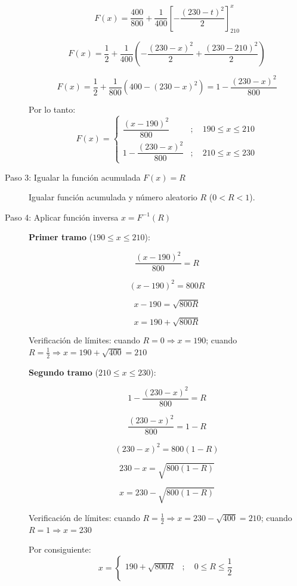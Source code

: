 \documentclass{article}
\begin{document}
\begin{description}
\[
F(x)
=
\frac{400}{800}
+
\frac{1}{400}\left[-\frac{(230-t)^2}{2}\right]_{210}^{x}
\]

\[
F(x)
=
\frac{1}{2}
+
\frac{1}{400}\left(-\frac{(230-x)^2}{2}+\frac{(230-210)^2}{2}\right)
\]
    
    \[
    F(x)
    =
    \frac{1}{2}
    +
    \frac{1}{800}\left(400-(230-x)^2\right)
    =
    1-\frac{(230-x)^2}{800}
    \]
    
    Por lo tanto:
    \[
    F(x)=
    \begin{cases}
    \dfrac{(x-190)^2}{800}
    & ; \quad 190 \le x \le 210
    \\[10pt]
    
    1-\dfrac{(230-x)^2}{800}
    & ; \quad 210 \le x \le 230
    \end{cases}
    \]
    
    \item[Paso 3: Igualar la función acumulada $F(x) = R$]
    
    Igualar función acumulada y número aleatorio $R$ ($0 < R < 1$).
    
    \item[Paso 4: Aplicar función inversa $x = F^{-1}(R)$]

\textbf{Primer tramo} ($190 \le x \le 210$):

\[
\frac{(x-190)^2}{800}=R
\]

\[
(x-190)^2=800R
\]

\[
x-190=\sqrt{800R}
\]

\[
x=190+\sqrt{800R}
\]

Verificación de límites: cuando $R=0 \Rightarrow x=190$; cuando $R=\frac{1}{2} \Rightarrow x=190+\sqrt{400}=210$

\textbf{Segundo tramo} ($210 \le x \le 230$):

\[
1-\frac{(230-x)^2}{800}=R
\]

\[
\frac{(230-x)^2}{800}=1-R
\]

\[
(230-x)^2=800(1-R)
\]

\[
230-x=\sqrt{800(1-R)}
\]

\[
x=230-\sqrt{800(1-R)}
\]

Verificación de límites: cuando $R=\frac{1}{2} \Rightarrow x=230-\sqrt{400}=210$; cuando $R=1 \Rightarrow x=230$
    
    Por consiguiente:
    \[
    x=
    \begin{cases}
    190+\sqrt{800R}
    &
    ;\quad 0\le R\le \dfrac{1}{2}
    \\[10pt]
    

\end{cases}\]
\end{description}
\end{document}
